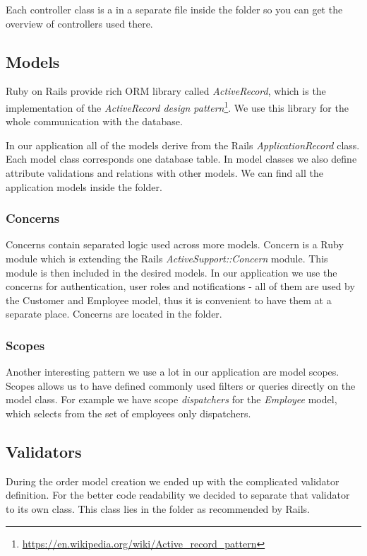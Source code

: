 	Each controller class is a in a separate file inside the  folder so you can get  the overview  of controllers used there.
	\subsection{Models}
		Ruby on Rails provide rich ORM library called \textit{ActiveRecord}, which is the implementation of the \textit{ActiveRecord design pattern}\footnote{\url{https://en.wikipedia.org/wiki/Active\_record\_pattern}}. We use this library for the whole communication with the database.
		
		In our application all of the models derive from the Rails \textit{ApplicationRecord} class. Each model class corresponds one database table. In model classes we also define attribute validations and relations with other models. We can find all the application models inside the  folder.
		
		\subsubsection{Concerns}
			Concerns contain separated logic used across more models. Concern is a Ruby module which is extending the Rails \textit{ActiveSupport::Concern} module. This module is then included in the desired models. 
			In our application we use the concerns for authentication, user roles and notifications - all of them are used by the Customer and Employee model, thus it is convenient to have them at a separate place. Concerns are located in the  folder.
		\subsubsection{Scopes}
			Another interesting pattern we use a lot in our application are model scopes. Scopes allows us to have defined commonly used filters or queries directly on the model class. For example we have scope \textit{dispatchers} for the \textit{Employee} model, which selects from the set of employees only dispatchers.
		
	\subsection{Validators}
		During the order model creation we ended up with the complicated validator definition. For the better code readability we decided to separate that validator to its own class. This class lies in the  folder as recommended by Rails.
		
